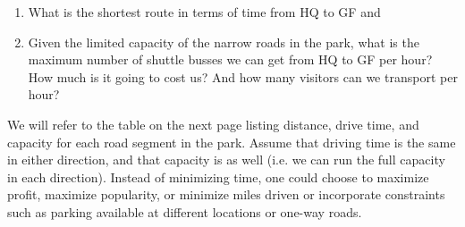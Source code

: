 \documentclass[10pt]{article}
\begin{document}
\begin{enumerate}
  \item What is the shortest route in terms of time from HQ to GF and

  \item Given the limited capacity of the narrow roads in the park, what is the maximum number of shuttle busses we can get from HQ to GF per hour? How much is it going to cost us? And how many visitors can we transport per hour?

\end{enumerate}
We will refer to the table on the next page listing distance, drive time, and capacity for each road segment in the park. Assume that driving time is the same in either direction, and that capacity is as well (i.e. we can run the full capacity in each direction). Instead of minimizing time, one could choose to maximize profit, maximize popularity, or minimize miles driven or incorporate constraints such as parking available at different locations or one-way roads.
\end{document}
